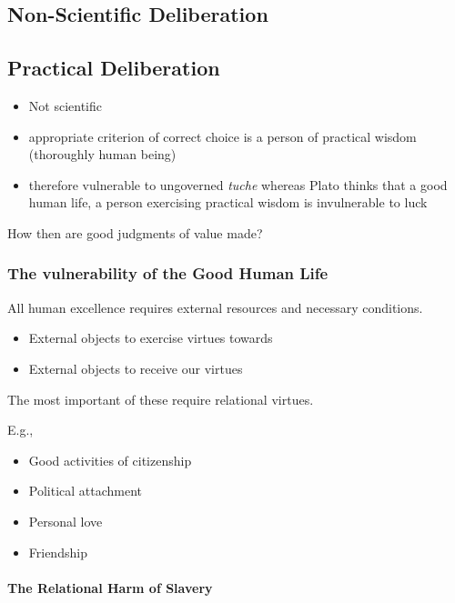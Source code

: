 \documentclass[
  letterpaper,
  DIV=11,
  numbers=noendperiod]{scrreprt}
\providecommand{\tightlist}{%
  \setlength{\itemsep}{0pt}\setlength{\parskip}{0pt}}\usepackage{longtable,booktabs,array}
\begin{document}
\begin{tcolorbox}[enhanced jigsaw, arc=.35mm, breakable, rightrule=.15mm, colback=white, colframe=quarto-callout-important-color-frame, bottomrule=.15mm, leftrule=.75mm, opacityback=0, toprule=.15mm, left=2mm]
\begin{tcolorbox}[enhanced jigsaw, arc=.35mm, breakable, rightrule=.15mm, colback=white, colframe=quarto-callout-tip-color-frame, bottomrule=.15mm, leftrule=.75mm, opacityback=0, toprule=.15mm, left=2mm]
\chapter{Non-Scientific Deliberation}\label{non-scientific-deliberation}

\section{Practical Deliberation}\label{practical-deliberation}

\begin{itemize}
\tightlist
\item
  Not scientific
\item
  appropriate criterion of correct choice is a person of practical
  wisdom (thoroughly human being)
\item
  therefore vulnerable to ungoverned \emph{tuche} whereas Plato thinks
  that a good human life, a person exercising practical wisdom is
  invulnerable to luck
\end{itemize}

How then are good judgments of value made?

\subsection{The vulnerability of the Good Human
Life}\label{the-vulnerability-of-the-good-human-life}

All human excellence requires external resources and necessary
conditions.

\begin{itemize}
\tightlist
\item
  External objects to exercise virtues towards
\item
  External objects to receive our virtues
\end{itemize}

The most important of these require relational virtues.

E.g.,

\begin{itemize}
\tightlist
\item
  Good activities of citizenship
\item
  Political attachment
\item
  Personal love
\item
  Friendship
\end{itemize}

\subsubsection{The Relational Harm of
Slavery}\label{the-relational-harm-of-slavery}


\end{tcolorbox}
\end{tcolorbox}
\end{document}
